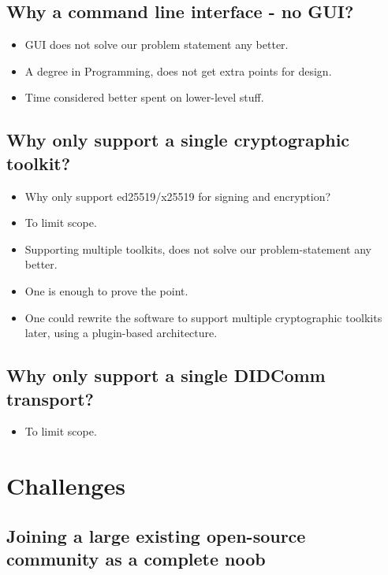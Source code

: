 \subsection{Why a command line interface - no GUI?}

\begin{itemize}
\item GUI does not solve our problem statement any better.
\item A degree in Programming, does not get extra points for design.
\item Time considered better spent on lower-level stuff.
\end{itemize}



\subsection{Why only support a single cryptographic toolkit?}
\begin{itemize}

    \item Why only support ed25519/x25519 for signing and encryption?
    \item To limit scope.
    \item Supporting multiple toolkits, does not solve our problem-statement any better.
    \item One is enough to prove the point.
    \item One could rewrite the software to support multiple cryptographic toolkits later, using a plugin-based architecture.
\end{itemize}



\subsection{Why only support a single DIDComm transport?}
\begin{itemize}
    \item To limit scope.
\end{itemize}








\section{Challenges}

\subsection{Joining a large existing open-source community as a complete noob}

